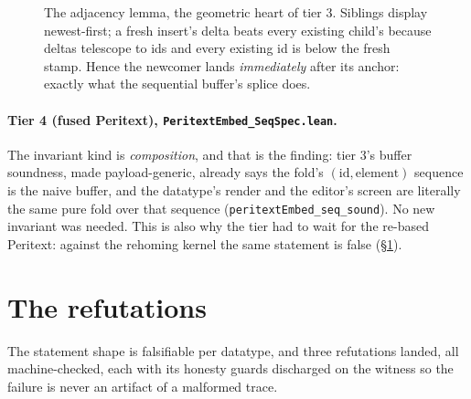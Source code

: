 \documentclass[11pt]{article}
\newcommand{\code}[1]{\texttt{#1}}
\begin{document}
\begin{figure}[h]
\centering
{}
\caption{The adjacency lemma, the geometric heart of tier 3. Siblings
display newest-first; a fresh insert's delta beats every existing
child's because deltas telescope to ids and every existing id is below
the fresh stamp. Hence the newcomer lands \emph{immediately} after its
anchor: exactly what the sequential buffer's splice does.}
\label{fig:adjacency}
\end{figure}

\paragraph{Tier 4 (fused Peritext),
\code{PeritextEmbed\_SeqSpec.lean}.}
The invariant kind is \emph{composition}, and that is the finding:
tier 3's buffer soundness, made payload-generic, already says the
fold's $(\mathrm{id}, \mathrm{element})$ sequence is the naive buffer,
and the datatype's render and the editor's screen are literally the
same pure fold over that sequence
(\code{peritextEmbed\_seq\_sound}). No new invariant was needed. This
is also why the tier had to wait for the re-based Peritext: against
the rehoming kernel the same statement is false
(\S\ref{sec:refuted}).

\section{The refutations}
\label{sec:refuted}

The statement shape is falsifiable per datatype, and three refutations
landed, all machine-checked, each with its honesty guards discharged
on the witness so the failure is never an artifact of a malformed
trace.
\end{document}
